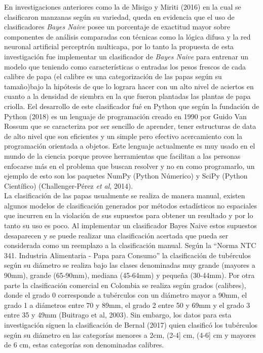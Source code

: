 En investigaciones anteriores como la de Misigo y Miriti (2016) en la cual se clasificaron manzanas según su variedad, queda en evidencia que el uso de clasificadores \textit{Bayes Naive} posee un porcentaje de exactitud mayor sobre componentes de análisis comparadas con técnicas como la  lógica difusa y la red neuronal artificial perceptrón multicapa, por lo tanto la propuesta de esta investigación fue implementar un clasificador de \textit{Bayes Naive} para entrenar un modelo que teniendo como características o entradas los pesos frescos de cada calibre de papa (el calibre es una categorización de las papas según su tamaño)bajo la hipótesis de que lo lograra hacer con un alto nivel de aciertos en cuanto a  la densidad de siembra en la que fueron plantadas las plantas de papa criolla. Eel desarrollo de este clasificador fué en Python que según la fundación de Python (2018) es un lenguaje de programación creado en 1990 por Guido Van Rossum que se caracteriza por ser sencillo de aprender, tener estructuras de data de alto nivel que son eficientes y un simple pero efectivo acercamiento con la programación orientada a objetos. Este lenguaje actualmente es muy usado en el mundo de la ciencia porque provee herramientas que facilitan a las personas enfocarse más en el problema que buscan resolver y no en como programarlo, un ejemplo de esto son los paquetes NumPy (Python Númerico) y SciPy (Python Científico) (Challenger-Pérez \textit{et al}, 2014).\\

La clasificación de las papas usualmente se realiza de manera manual, existen algunos modelos de clasificación generados por métodos estadísticos no espaciales que incurren en la violación de sus supuestos para obtener un resultado y por lo tanto su uso es poco. Al implementar un clasificador Bayes Naive estos supuestos desaparecen y se puede realizar una clasificación acertada que pueda ser considerada como un reemplazo a la clasificación manual. Según la "`Norma NTC 341. Industria Alimentaria - Papa para Consumo"' la clasificación de tubérculos según su diámetro se realiza bajo las clases denominadas muy grande (mayores a 90mm), grande (65-90mm), mediana (45-64mm) y pequeña (30-44mm). Por otra parte la clasificación comercial en Colombia se realiza según grados (calibres), donde el grado 0 corresponde a tubérculos con un diámetro mayor a 90mm, el grado 1 a diámetros entre 70 y 89mm, el grado 2 entre 50 y 69mm y el grado 3 entre 35 y 49mm (Buitrago et al, 2003). Sin embargo, los datos para esta investigación siguen la clasificación de Bernal (2017) quien clasificó los tubérculos según su diámetro en las categorías menores a 2cm, (2-4] cm, (4-6] cm y mayores de 6 cm, estas categorías son denominadas calibres.\\

